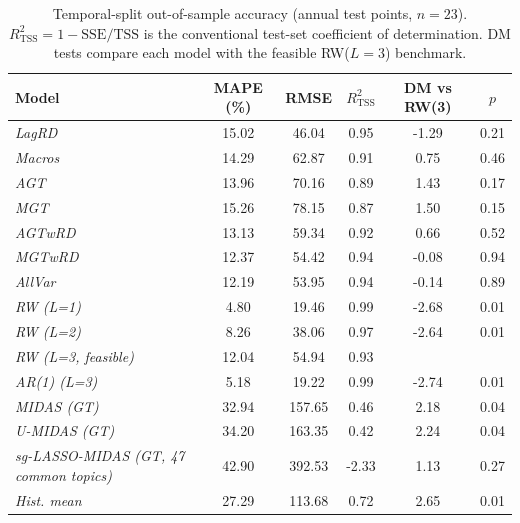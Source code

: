\begin{table}[!htb]
\centering
\caption{Temporal-split out-of-sample accuracy (annual test points, $n=23$). $R^2_{\mathrm{TSS}}=1-\mathrm{SSE}/\mathrm{TSS}$ is the conventional test-set coefficient of determination. DM tests compare each model with the feasible RW($L{=}3$) benchmark.}
\label{tab:temporal_benchmarks}
\begin{tabular}{l c c c c c}
\toprule
Model & MAPE (\%) & RMSE & $R^2_{\mathrm{TSS}}$ & DM vs RW(3) & $p$ \\
\midrule
\textit{LagRD} & 15.02 & 46.04 & 0.95 & -1.29 & 0.21 \\
\textit{Macros} & 14.29 & 62.87 & 0.91 & 0.75 & 0.46 \\
\textit{AGT} & 13.96 & 70.16 & 0.89 & 1.43 & 0.17 \\
\textit{MGT} & 15.26 & 78.15 & 0.87 & 1.50 & 0.15 \\
\textit{AGTwRD} & 13.13 & 59.34 & 0.92 & 0.66 & 0.52 \\
\textit{MGTwRD} & 12.37 & 54.42 & 0.94 & -0.08 & 0.94 \\
\textit{AllVar} & 12.19 & 53.95 & 0.94 & -0.14 & 0.89 \\
\midrule
\textit{RW (L=1)} & 4.80 & 19.46 & 0.99 & -2.68 & 0.01 \\
\textit{RW (L=2)} & 8.26 & 38.06 & 0.97 & -2.64 & 0.01 \\
\textit{RW (L=3, feasible)} & 12.04 & 54.94 & 0.93 &  &  \\
\midrule
\textit{AR(1) (L=3)} & 5.18 & 19.22 & 0.99 & -2.74 & 0.01 \\
\textit{MIDAS (GT)} & 32.94 & 157.65 & 0.46 & 2.18 & 0.04 \\
\textit{U-MIDAS (GT)} & 34.20 & 163.35 & 0.42 & 2.24 & 0.04 \\
\textit{sg-LASSO-MIDAS (GT, 47 common topics)} & 42.90 & 392.53 & -2.33 & 1.13 & 0.27 \\
\textit{Hist. mean} & 27.29 & 113.68 & 0.72 & 2.65 & 0.01 \\
\bottomrule
\end{tabular}
\end{table}
